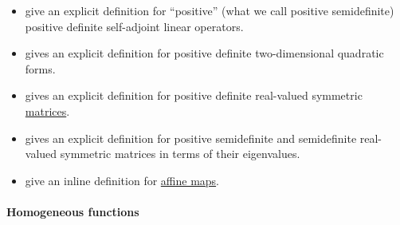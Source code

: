 \begin{remark}
\begin{itemize}
    \item {} give an explicit definition for \enquote{positive} (what we call positive semidefinite) positive definite self-adjoint linear operators.

    \item {} gives an explicit definition for positive definite two-dimensional quadratic forms.

    \item {} gives an explicit definition for positive definite real-valued symmetric \hyperref[def:array/matrix]{matrices}.

    \item {} gives an explicit definition for positive semidefinite and semidefinite real-valued symmetric matrices in terms of their eigenvalues.

    \item {} give an inline definition for \hyperref[def:affine_operator]{affine maps}.
  \end{itemize}
\end{remark}

\paragraph{Homogeneous functions}

